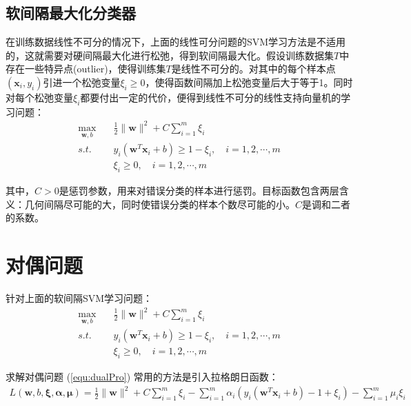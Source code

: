\subsection{软间隔最大化分类器}
在训练数据线性不可分的情况下，上面的线性可分问题的SVM学习方法是不适用的，这就需要对硬间隔最大化进行松弛，得到软间隔最大化。假设训练数据集$T$中存在一些特异点(outlier)，使得训练集$T$是线性不可分的。对其中的每个样本点$(\mathbf{x}_i,y_i)$引进一个松弛变量$\xi_i \ge 0$，使得函数间隔加上松弛变量后大于等于1。同时对每个松弛变量$\xi_i$都要付出一定的代价，便得到线性不可分的线性支持向量机的学习问题：
\begin{equation}
\begin{split} %
   \max_{\mathbf{w},b} \quad & \frac{1}{2}\|\mathbf{w}\|^2+C\sum^m_{i=1}\xi_i \\
   s.t. \quad & y_i(\mathbf{w}^T\mathbf{x}_i+b) \ge 1-\xi_i, \quad i=1,2,\cdots,m \\
   & \xi_i \ge 0, \quad  i=1,2,\cdots,m
\end{split}
\end{equation}

其中，$C > 0$是惩罚参数，用来对错误分类的样本进行惩罚。目标函数包含两层含义：几何间隔尽可能的大，同时使错误分类的样本个数尽可能的小。$C$是调和二者的系数。

\section{对偶问题}
针对上面的软间隔SVM学习问题：
\begin{equation}
\begin{split} %
   \max_{\mathbf{w},b} \quad & \frac{1}{2}\|\mathbf{w}\|^2+C\sum^m_{i=1}\xi_i \\
   s.t. \quad & y_i(\mathbf{w}^T\mathbf{x}_i+b) \ge 1-\xi_i, \quad i=1,2,\cdots,m \\
   & \xi_i \ge 0, \quad  i=1,2,\cdots,m
\end{split}
\label{equ:dualPro}
\end{equation}

求解对偶问题 (\ref{equ:dualPro}) 常用的方法是引入拉格朗日函数：
\begin{align} %
   L(\mathbf{w},b,\mathbf{\xi},\mathbf{\alpha},\mathbf{\mu})=\frac{1}{2}\|\mathbf{w}\|^2+C\sum^{m}_{i=1}\xi_i-\sum^{m}_{i=1}\alpha_i(y_i(\mathbf{w}^T\mathbf{x}_i+b)-1+\xi_i)-\sum^m_{i=1}\mu_i\xi_i \label{equ:Lagrange}
\end{align}

